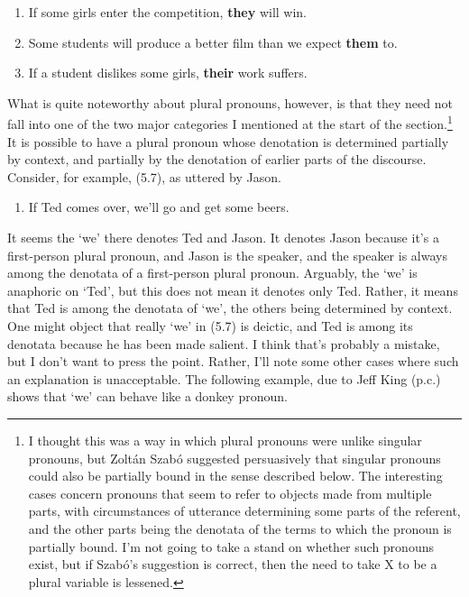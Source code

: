 \documentclass[
  10pt,
  letterpaper,
  DIV=11,
  numbers=noendperiod,
  twoside]{scrartcl}
\providecommand{\tightlist}{%
  \setlength{\itemsep}{0pt}\setlength{\parskip}{0pt}}\usepackage{longtable,booktabs,array}
\begin{document}
\begin{enumerate}
\def\labelenumi{\arabic{enumi}.}
\setcounter{enumi}{3}
\tightlist
\item
  If some girls enter the competition, \textbf{they} will win.
\item
  Some students will produce a better film than we expect \textbf{them}
  to.
\item
  If a student dislikes some girls, \textbf{their} work suffers.
\end{enumerate}

What is quite noteworthy about plural pronouns, however, is that they
need not fall into one of the two major categories I mentioned at the
start of the section.\footnote{I thought this was a way in which plural
  pronouns were unlike singular pronouns, but Zoltán Szabó suggested
  persuasively that singular pronouns could also be partially bound in
  the sense described below. The interesting cases concern pronouns that
  seem to refer to objects made from multiple parts, with circumstances
  of utterance determining some parts of the referent, and the other
  parts being the denotata of the terms to which the pronoun is
  partially bound. I'm not going to take a stand on whether such
  pronouns exist, but if Szabó's suggestion is correct, then the need to
  take X to be a plural variable is lessened.} It is possible to have a
plural pronoun whose denotation is determined partially by context, and
partially by the denotation of earlier parts of the discourse. Consider,
for example, (5.7), as uttered by Jason.

\begin{enumerate}
\def\labelenumi{\arabic{enumi}.}
\setcounter{enumi}{6}
\tightlist
\item
  If Ted comes over, we'll go and get some beers.
\end{enumerate}

It seems the `we' there denotes Ted and Jason. It denotes Jason because
it's a first-person plural pronoun, and Jason is the speaker, and the
speaker is always among the denotata of a first-person plural pronoun.
Arguably, the `we' is anaphoric on `Ted', but this does not mean it
denotes only Ted. Rather, it means that Ted is among the denotata of
`we', the others being determined by context. One might object that
really `we' in (5.7) is deictic, and Ted is among its denotata because
he has been made salient. I think that's probably a mistake, but I don't
want to press the point. Rather, I'll note some other cases where such
an explanation is unacceptable. The following example, due to Jeff King
(p.c.) shows that `we' can behave like a donkey pronoun.
\end{document}
